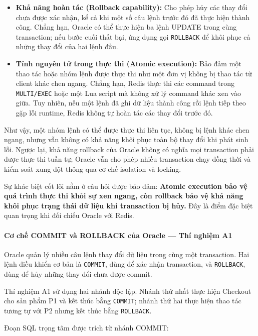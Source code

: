 \begin{itemize}[leftmargin=*,itemsep=2pt,topsep=4pt]
\item
\textbf{Khả năng hoàn tác (Rollback capability):} Cho phép hủy các thay đổi chưa được xác nhận, kể cả khi một số câu lệnh trước đó đã thực hiện thành công. Chẳng hạn, Oracle có thể thực hiện ba lệnh UPDATE trong cùng transaction; nếu bước cuối thất bại, ứng dụng gọi \texttt{ROLLBACK} để khôi phục cả những thay đổi của hai lệnh đầu.

\item
\textbf{Tính nguyên tử trong thực thi (Atomic execution):} Bảo đảm một thao tác hoặc nhóm lệnh được thực thi như một đơn vị không bị thao tác từ client khác chen ngang. Chẳng hạn, Redis thực thi các command trong \texttt{MULTI/\allowbreak{}EXEC} hoặc một Lua script mà không xử lý command khác xen vào giữa. Tuy nhiên, nếu một lệnh đã ghi dữ liệu thành công rồi lệnh tiếp theo gặp lỗi runtime, Redis không tự hoàn tác các thay đổi trước đó.

\end{itemize}
Như vậy, một nhóm lệnh có thể được thực thi liên tục, không bị lệnh khác chen ngang, nhưng vẫn không có khả năng khôi phục toàn bộ thay đổi khi phát sinh lỗi. Ngược lại, khả năng rollback của Oracle không có nghĩa mọi transaction phải được thực thi tuần tự; Oracle vẫn cho phép nhiều transaction chạy đồng thời và kiểm soát xung đột thông qua cơ chế isolation và locking.

Sự khác biệt cốt lõi nằm ở câu hỏi được bảo đảm: \textbf{Atomic execution bảo vệ quá trình thực thi khỏi sự xen ngang, còn rollback bảo vệ khả năng khôi phục trạng thái dữ liệu khi transaction bị hủy.} Đây là điểm đặc biệt quan trọng khi đối chiếu Oracle với Redis.

\paragraph*{Cơ chế COMMIT và ROLLBACK của Oracle — Thí nghiệm A1}

Oracle quản lý nhiều câu lệnh thay đổi dữ liệu trong cùng một transaction. Hai lệnh điều khiển cơ bản là \texttt{COMMIT}, dùng để xác nhận transaction, và \texttt{ROLLBACK}, dùng để hủy những thay đổi chưa được commit.

Thí nghiệm A1 sử dụng hai nhánh độc lập. Nhánh thứ nhất thực hiện Checkout cho sản phẩm P1 và kết thúc bằng \texttt{COMMIT}; nhánh thứ hai thực hiện thao tác tương tự với P2 nhưng kết thúc bằng \texttt{ROLLBACK}.

Đoạn SQL trọng tâm được trích từ nhánh COMMIT:

